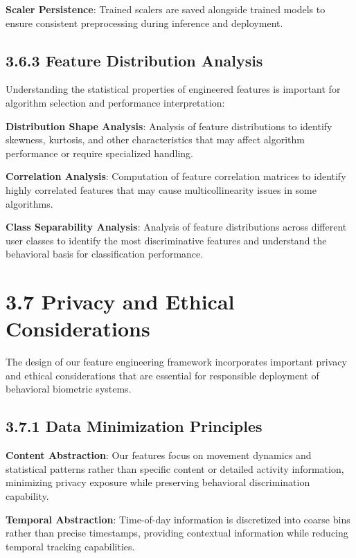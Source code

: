 \documentclass[
  12pt,
  a4paper,
]{report}
\begin{document}
\textbf{Scaler Persistence}: Trained scalers are saved alongside trained
models to ensure consistent preprocessing during inference and
deployment.

\subsection{3.6.3 Feature Distribution
Analysis}\label{feature-distribution-analysis}

Understanding the statistical properties of engineered features is
important for algorithm selection and performance interpretation:

\textbf{Distribution Shape Analysis}: Analysis of feature distributions
to identify skewness, kurtosis, and other characteristics that may
affect algorithm performance or require specialized handling.

\textbf{Correlation Analysis}: Computation of feature correlation
matrices to identify highly correlated features that may cause
multicollinearity issues in some algorithms.

\textbf{Class Separability Analysis}: Analysis of feature distributions
across different user classes to identify the most discriminative
features and understand the behavioral basis for classification
performance.

\section{3.7 Privacy and Ethical
Considerations}\label{privacy-and-ethical-considerations}

The design of our feature engineering framework incorporates important
privacy and ethical considerations that are essential for responsible
deployment of behavioral biometric systems.

\subsection{3.7.1 Data Minimization
Principles}\label{data-minimization-principles}

\textbf{Content Abstraction}: Our features focus on movement dynamics
and statistical patterns rather than specific content or detailed
activity information, minimizing privacy exposure while preserving
behavioral discrimination capability.

\textbf{Temporal Abstraction}: Time-of-day information is discretized
into coarse bins rather than precise timestamps, providing contextual
information while reducing temporal tracking capabilities.
\end{document}
